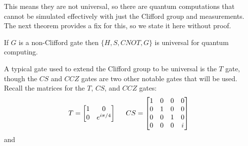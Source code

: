 \documentclass[12pt]{dalthesis}
\begin{document}
This means they are not universal, so there are quantum computations that cannot be simulated effectively with just the Clifford group and measurements. The next theorem provides a fix for this, so we state it here without proof.

\begin{theorem}
If $G$ is a non-Clifford gate then $\{ H, S, CNOT, G \}$ is universal for quantum computing.
\end{theorem}

A typical gate used to extend the Clifford group to be universal is the $T$ gate, though the $CS$ and $CCZ$ gates are two other notable gates that will be used. Recall the matrices for the $T$, $CS$, and $CCZ$ gates:
\begin{equation*}
T = 
\begin{bmatrix}
1 & 0 \\
0 & e^{i\pi/4}
\end{bmatrix}
\hspace{5mm}
CS = 
\begin{bmatrix}
1 & 0 & 0 & 0 \\
0 & 1 & 0 & 0 \\
0 & 0 & 1 & 0 \\
0 & 0 & 0 & i \\
\end{bmatrix}
\end{equation*}
and
\end{document}

